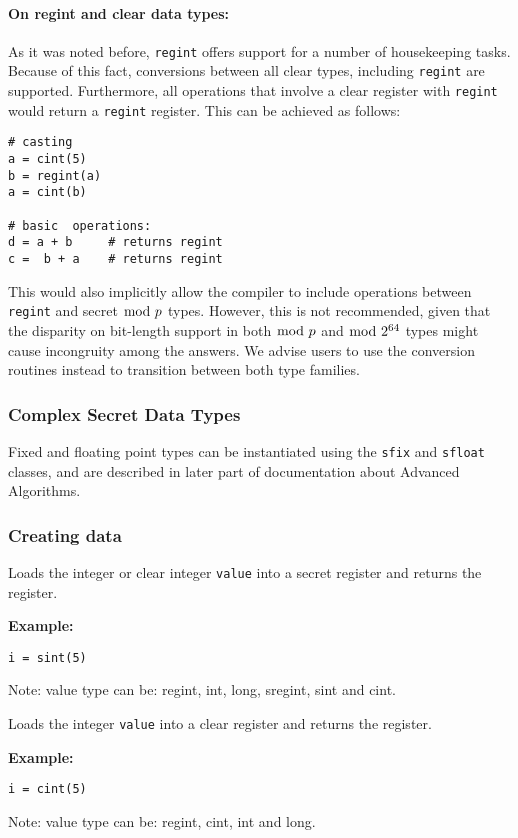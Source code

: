 \paragraph{On regint and clear data types:} As it was noted before, \verb|regint| offers support for a number of housekeeping tasks. Because of this fact, conversions between all clear types, including \verb|regint| are supported. Furthermore, all operations that involve a clear register with \verb|regint| would return a \verb|regint| register. This can be achieved as follows: 
\begin{lstlisting}
# casting
a = cint(5)
b = regint(a)
a = cint(b)

# basic  operations:
d = a + b     # returns regint
c =  b + a    # returns regint
\end{lstlisting}
This would also implicitly allow the compiler to include operations between \verb|regint| and secret $\bmod \; p$ types. However, this is not recommended, given that the disparity on bit-length support in both $\bmod \; p$ and $\bmod \; 2^{64}$ types might cause incongruity among the answers. We advise users to use the conversion routines instead to transition between both type families.

\subsubsection{Complex Secret Data Types}
Fixed and floating point types can be instantiated using the \verb|sfix| and \verb|sfloat| classes, and are described in later part of documentation about Advanced Algorithms.

\subsubsection{Creating data}
Loads the integer or clear integer \verb|value| into a secret register and returns the register.

\noindent
\textbf{Example:}
\begin{lstlisting}
i = sint(5)
\end{lstlisting}
\begin{footnotesize}
Note: value type can be: regint, int, long, sregint, sint and cint.
\end{footnotesize}

Loads the integer \verb|value| into a clear register and returns the register.

\noindent
\textbf{Example:}
\begin{lstlisting}
i = cint(5)
\end{lstlisting}
\begin{footnotesize}
Note: value type can be: regint, cint, int and long.
\end{footnotesize}

